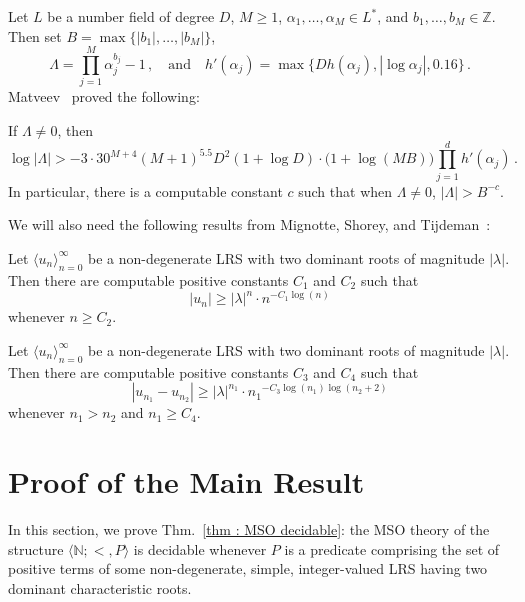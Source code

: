 \documentclass[a4paper,UKenglish,cleveref, autoref, thm-restate]{lipics-v2021}
\newcommand{\nat} {\mathbb{N}}
\begin{document}
Let $L$ be a number field of degree $D$, $M \ge 1$, $\alpha_1,\dots,\alpha_M \in L^*$, and $b_1,\dots,b_M \in \mathbb{Z}$. Then set $B =\max\{|b_1|,\dots,|b_M|\}$,
\begin{equation*}
    \Lambda = \prod_{j = 1}^M \alpha_j^{b_j} - 1 \, , \quad \text{and} \quad
    h'(\alpha_j) = \max\big\{Dh(\alpha_j), |\log{\alpha_j}|, 0.16\big\} \, .
\end{equation*}
Matveev~\cite{matveev2000explicit} proved the following:
\begin{theorem}\label{thm : Matveev}
    If $\Lambda \ne 0$, then
    \begin{equation*}
        \log{|\Lambda|} > -3  \cdot 30^{M+4}(M+1)^{5.5}D^2(1+\log{D})\cdot \big(1 + \log(MB)\big)\prod_{j=1}^d h'(\alpha_j) \, .
    \end{equation*}
    In particular, there is a computable constant $c$ such that when $\Lambda \ne 0$, $|\Lambda| > B^{-c}$.
\end{theorem}

We will also need the following results from Mignotte, Shorey, and Tijdeman~\cite{shorey1984distance}:
\begin{theorem}\label{thm : MST size LRS}
    Let $\langle u_n \rangle_{n=0}^\infty$ be a non-degenerate LRS
    with two  dominant roots of magnitude $|\lambda|$. Then there are
    computable positive constants $C_1$ and $C_2$ such that
    \begin{equation*}
        |u_n| \ge |\lambda|^n \cdot n^{-C_1\log(n)}
    \end{equation*}
    whenever $n \ge C_2$.
\end{theorem}
\begin{theorem}\label{thm : MST size difference terms of LRS}
    Let $\langle u_n \rangle_{n=0}^\infty$ be a non-degenerate LRS
    with two  dominant roots of magnitude $|\lambda|$. Then there are
    computable positive constants $C_3$ and $C_4$ such that
    \begin{equation*}
        |u_{n_1} - u_{n_2}| \ge |\lambda|^{n_1} \cdot {n_1}^{-C_3\log({n_1})\log({n_2}+2)}
    \end{equation*}
    whenever ${n_1} > {n_2}$ and ${n_1} \ge C_4$.
\end{theorem}


\section{Proof of the Main Result}

In this section, we prove Thm.~\ref{thm : MSO decidable}: the
MSO theory of the structure $\langle \nat ; < , P\rangle$ is decidable
whenever $P$ is a predicate comprising the set of positive terms of
some non-degenerate, simple, integer-valued LRS having two dominant
characteristic roots.
\end{document}
